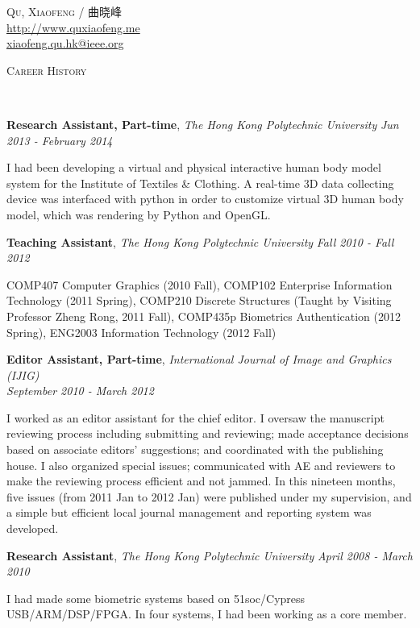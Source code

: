 \documentclass[9pt]{article}
\newenvironment{changemargin}[2]{%
  \begin{list}{}{%
    \setlength{\topsep}{0pt}%
    \setlength{\leftmargin}{#1}%
    \setlength{\rightmargin}{#2}%
    \setlength{\listparindent}{\parindent}%
    \setlength{\itemindent}{\parindent}%
    \setlength{\parsep}{\parskip}%
  }%
  \item[]}{\end{list}
}
\newcommand{\lineover}{
	\begin{changemargin}{-0.05in}{-0.05in}
		\vspace*{-8pt}
		\hrulefill \\
		\vspace*{-2pt}
	\end{changemargin}
}
\newcommand{\header}[1]{
	\begin{changemargin}{-0.5in}{-0.5in}
		\scshape{#1}\\
  	\lineover
	\end{changemargin}
}
\newcommand{\contact}[3]{
	\begin{changemargin}{-0.5in}{-0.5in}
		\begin{center}
			{\Large \scshape {#1}}\\ \smallskip
      {\url{#2}}\\ \smallskip 
      {\href{mailto:#3}{#3}}\\ \smallskip
		\end{center}
	\end{changemargin}
}
\newcommand{\jobtitle}[3]{
	\textbf{#1}, \emph{#2} \hfill \emph{#3}\\
}
\newcommand{\jobdescription}[1]{
	\begin{changemargin}{0.15in}{0.15in}
    \smallskip
		{#1}
    \medskip
	\end{changemargin}
}
\newenvironment{body} {
	\vspace*{-16pt}
	\begin{changemargin}{-0.25in}{-0.5in}
  }	
	{\end{changemargin}
}
\begin{document}
\contact{Qu, Xiaofeng / 曲晓峰}{http://www.quxiaofeng.me}{xiaofeng.qu.hk@ieee.org}


\header{Career History}

\begin{body}
  \vspace{14pt}

    \jobtitle{Research Assistant, Part-time}{The Hong Kong Polytechnic University}{Jun 2013 - February 2014}
    \jobdescription{
        I had been developing a virtual and physical interactive human body model system for the Institute of Textiles \& Clothing. A real-time 3D data collecting device was interfaced with python in order to customize virtual 3D human body model, which was rendering by Python and OpenGL.
    }

    \jobtitle{Teaching Assistant}{The Hong Kong Polytechnic University}{Fall 2010 - Fall 2012}
    \jobdescription {
        COMP407 Computer Graphics (2010 Fall),
        COMP102 Enterprise Information Technology (2011 Spring), 
        COMP210 Discrete Structures (Taught by Visiting Professor Zheng Rong, 2011 Fall),  COMP435p Biometrics Authentication (2012 Spring), 
        ENG2003 Information Technology (2012 Fall)
    }

    \jobtitle{Editor Assistant, Part-time}{International Journal of Image and Graphics (IJIG)\\}{September 2010 - March 2012}
    \jobdescription{
        I worked as an editor assistant for the chief editor. I oversaw the manuscript reviewing process including submitting and reviewing; made acceptance decisions based on associate editors' suggestions; and coordinated with the publishing house. I also organized special issues; communicated with AE and reviewers to make the reviewing process efficient and not jammed. In this nineteen months, five issues (from 2011 Jan to 2012 Jan) were published under my supervision, and a simple but efficient local journal management and reporting system was developed.
    }

	\jobtitle{Research Assistant}{The Hong Kong Polytechnic University}{April 2008 - March 2010}
    \jobdescription{
        I had made some biometric systems based on 51soc/Cypress USB/ARM/DSP/FPGA. In four systems, I had been working as a core member.
    }

\end{body}
\end{document}
